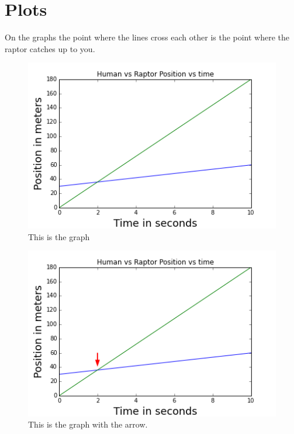 \documentclass[twocolumn]{revtex4}
\begin{document}
\section{Plots}
On the graphs the point where the lines cross each other is the point where the raptor catches up to you.
\begin{figure}[h]
	\centering
	\includegraphics{RaptorVHuman.png}
	\caption{This is the graph \label{fig:Graph}}
\end{figure}

\begin{figure}[h]
	\centering
	\includegraphics{Arrow.png}
	\caption{This is the graph with the arrow. \label{fig:Graph}}
\end{figure}


\end{document}
